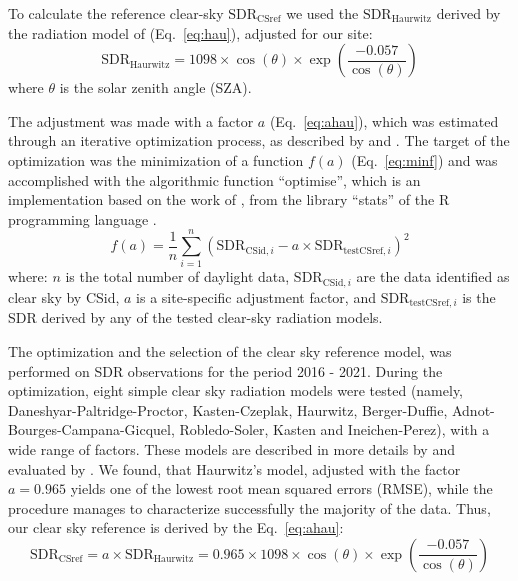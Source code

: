 \documentclass[applsci,article,submit,moreauthors,pdftex]{Definitions/mdpi}
\begin{document}
To calculate the reference clear-sky \(\text{SDR}_\text{CSref}\) we used
the \(\text{SDR}_\text{Haurwitz}\) derived by the radiation model of
\citet{Haurwitz1945} (Eq.~\ref{eq:hau}), adjusted for our site:
\begin{equation}
\text{SDR}_\text{Haurwitz} = 1098 \times \cos(\theta) \times \exp \left( \frac{ - 0.057}{\cos(\theta)} \right) \label{eq:hau}
\end{equation} where \(\theta\) is the solar zenith angle (SZA).

The adjustment was made with a factor \(a\) (Eq.~\ref{eq:ahau}), which
was estimated through an iterative optimization process, as described by
\citet{Long2000} and \citet{Reno2016}. The target of the optimization
was the minimization of a function \(f(a)\) (Eq.~\ref{eq:minf}) and was
accomplished with the algorithmic function ``optimise'', which is an
implementation based on the work of \citet{Brent1973}, from the library
``stats'' of the R programming language \citep{RCT2023}.
\begin{equation}
f(a) = \frac{1}{n}\sum_{i=1}^{n} ( \text{SDR}_{\text{CSid},i} - a \times \text{SDR}_{\text{testCSref},i} )^2 \label{eq:minf}
\end{equation} where: \(n\) is the total number of daylight data,
\(\text{SDR}_{\text{CSid},i}\) are the data identified as clear sky by
CSid, \(a\) is a site-specific adjustment factor, and
\(\text{SDR}_{\text{testCSref},i}\) is the SDR derived by any of the
tested clear-sky radiation models.

The optimization and the selection of the clear sky reference model, was
performed on SDR observations for the period 2016 - 2021. During the
optimization, eight simple clear sky radiation models were tested
(namely, Daneshyar-Paltridge-Proctor, Kasten-Czeplak, Haurwitz,
Berger-Duffie, Adnot-Bourges-Campana-Gicquel, Robledo-Soler, Kasten and
Ineichen-Perez), with a wide range of factors. These models are
described in more details by \citet{Reno2012} and evaluated by
\citet{Reno2016}. We found, that Haurwitz's model, adjusted with the
factor \(a = 0.965\) yields one of the lowest root mean squared errors
(RMSE), while the procedure manages to characterize successfully the
majority of the data. Thus, our clear sky reference is derived by the
Eq.~\ref{eq:ahau}: \begin{equation}
\text{SDR}_\text{CSref} = a \times \text{SDR}_\text{Haurwitz} = 0.965 \times 1098 \times \cos(\theta) \times \exp \left( \frac{ - 0.057}{\cos(\theta)} \right) \label{eq:ahau}
\end{equation}
\end{document}
